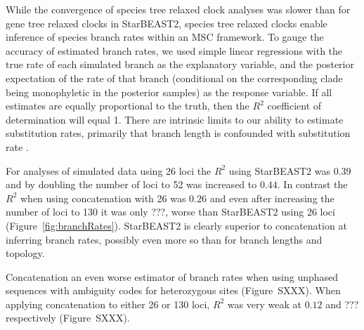 \documentclass[12pt]{article}
\begin{document}
While the convergence of species tree relaxed clock analyses was slower than
for gene tree relaxed clocks in StarBEAST2, species tree relaxed clocks enable
inference of species branch rates within an MSC framework. To gauge the
accuracy of estimated branch rates, we used simple linear regressions with the
true rate of each simulated branch as the explanatory variable, and the
posterior expectation of the rate of that branch (conditional on the
corresponding clade being monophyletic in the posterior samples) as the
response variable. If all estimates are equally proportional to the truth,
then the $R^2$ coefficient of determination will equal 1. There are intrinsic
limits to our ability to estimate substitution rates, primarily that branch
length is confounded with substitution rate \citep{Thorne01092002}.

For analyses of simulated data using 26 loci the $R^2$ using StarBEAST2 was
$0.39$ and by doubling the number of loci to 52 was increased to $0.44$.
In contrast the $R^2$ when using concatenation with 26 was $0.26$ and
even after increasing the number of loci to 130 it was only ???, worse
than StarBEAST2 using 26 loci (Figure~\ref{fig:branchRates}). StarBEAST2
is clearly superior to concatenation at inferring branch rates, possibly
even more so than for branch lengths and topology.

Concatenation an even worse estimator of branch rates when using unphased
sequences with ambiguity codes for heterozygous sites (Figure~SXXX). When
applying concatenation to either 26 or 130 loci, $R^2$ was very weak at $0.12$ and
??? respectively (Figure~SXXX).
\end{document}
